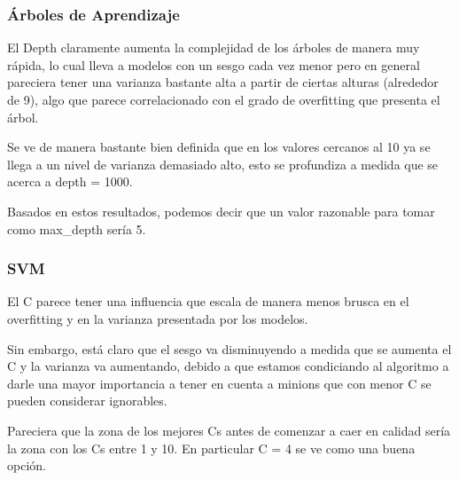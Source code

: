 \documentclass[11pt]{article}
\begin{document}
    \subsubsection{Árboles de Aprendizaje}\label{uxe1rboles-de-aprendizaje}

El Depth claramente aumenta la complejidad de los árboles de manera muy
rápida, lo cual lleva a modelos con un sesgo cada vez menor pero en
general pareciera tener una varianza bastante alta a partir de ciertas
alturas (alrededor de 9), algo que parece correlacionado con el grado de
overfitting que presenta el árbol.

Se ve de manera bastante bien definida que en los valores cercanos al 10
ya se llega a un nivel de varianza demasiado alto, esto se profundiza a
medida que se acerca a depth = 1000.

Basados en estos resultados, podemos decir que un valor razonable para
tomar como max\_depth sería 5.

\subsubsection{SVM}\label{svm}

El C parece tener una influencia que escala de manera menos brusca en el
overfitting y en la varianza presentada por los modelos.

Sin embargo, está claro que el sesgo va disminuyendo a medida que se
aumenta el C y la varianza va aumentando, debido a que estamos
condiciando al algoritmo a darle una mayor importancia a tener en cuenta
a minions que con menor C se pueden considerar ignorables.

Pareciera que la zona de los mejores Cs antes de comenzar a caer en
calidad sería la zona con los Cs entre 1 y 10. En particular C = 4 se ve
como una buena opción.
\end{document}
